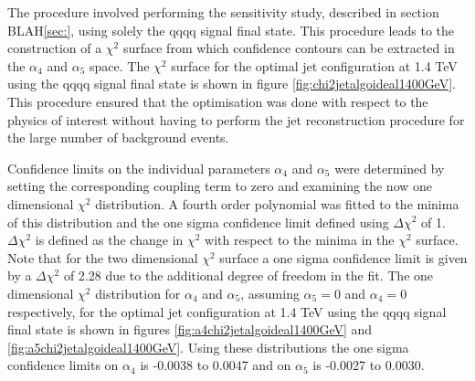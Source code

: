 The procedure involved performing the sensitivity study, described in section BLAH\ref{sec:}, using solely the {\nu}{\nu}qqqq signal final state.  This procedure leads to the construction of a $\chi^{2}$ surface from which confidence contours can be extracted in the $\alpha_{4}$ and $\alpha_{5}$ space.  The $\chi^{2}$ surface for the optimal jet configuration at 1.4 TeV using the {\nu}{\nu}qqqq signal final state is shown in figure \ref{fig:chi2jetalgoideal1400GeV}.  This procedure ensured that the optimisation was done with respect to the physics of interest without having to perform the jet reconstruction procedure for the large number of background events.  

Confidence limits on the individual parameters $\alpha_{4}$ and $\alpha_{5}$ were determined by setting the corresponding coupling term to zero and examining the now one dimensional $\chi^{2}$ distribution.  A fourth order polynomial was fitted to the minima of this distribution and the one sigma confidence limit defined using $\Delta\chi^{2}$ of 1.  $\Delta\chi^{2}$ is defined as the change in $\chi^{2}$ with respect to the minima in the $\chi^{2}$ surface.  Note that for the two dimensional $\chi^{2}$ surface a one sigma confidence limit is given by a $\Delta\chi^{2}$ of 2.28 due to the additional degree of freedom in the fit.  The one dimensional $\chi^{2}$ distribution for $\alpha_{4}$ and $\alpha_{5}$, assuming $\alpha_{5} = 0$ and $\alpha_{4} = 0$ respectively, for the optimal jet configuration at 1.4 TeV using the {\nu}{\nu}qqqq signal final state is shown in figures \ref{fig:a4chi2jetalgoideal1400GeV} and \ref{fig:a5chi2jetalgoideal1400GeV}.  Using these distributions the one sigma confidence limits on $\alpha_{4}$ is -0.0038 to 0.0047 and on $\alpha_{5}$ is -0.0027 to 0.0030.


